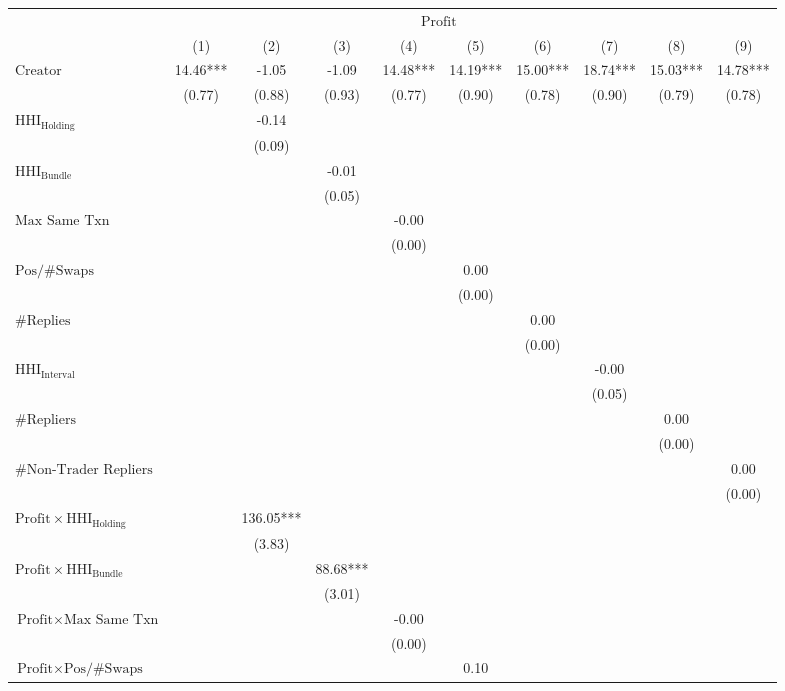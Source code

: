 \begin{tabular}{lccccccccc}
\hline
 & \multicolumn{8}{c}{$\text{Profit}$} \\ & (1) & (2) & (3) & (4) & (5) & (6) & (7) & (8) & (9)\\
\hline
$\text{Creator}$& 14.46*** & -1.05 & -1.09 & 14.48*** & 14.19*** & 15.00*** & 18.74*** & 15.03*** & 14.78*** \\
& (0.77) & (0.88) & (0.93) & (0.77) & (0.90) & (0.78) & (0.90) & (0.79) & (0.78) \\
$\text{HHI}_{\text{Holding}}$&  & -0.14 &  &  &  &  &  &  &  \\
&  & (0.09) &  &  &  &  &  &  &  \\
$\text{HHI}_{\text{Bundle}}$&  &  & -0.01 &  &  &  &  &  &  \\
&  &  & (0.05) &  &  &  &  &  &  \\
$\text{Max Same Txn}$&  &  &  & -0.00 &  &  &  &  &  \\
&  &  &  & (0.00) &  &  &  &  &  \\
$\text{Pos/\#Swaps}$&  &  &  &  & 0.00 &  &  &  &  \\
&  &  &  &  & (0.00) &  &  &  &  \\
$\#\text{Replies}$&  &  &  &  &  & 0.00 &  &  &  \\
&  &  &  &  &  & (0.00) &  &  &  \\
$\text{HHI}_{\text{Interval}}$&  &  &  &  &  &  & -0.00 &  &  \\
&  &  &  &  &  &  & (0.05) &  &  \\
$\#\text{Repliers}$&  &  &  &  &  &  &  & 0.00 &  \\
&  &  &  &  &  &  &  & (0.00) &  \\
$\#\text{Non-Trader Repliers}$&  &  &  &  &  &  &  &  & 0.00 \\
&  &  &  &  &  &  &  &  & (0.00) \\
$\text{Profit} \times \text{HHI}_{\text{Holding}}$&  & 136.05*** &  &  &  &  &  &  &  \\
&  & (3.83) &  &  &  &  &  &  &  \\
$\text{Profit} \times \text{HHI}_{\text{Bundle}}$&  &  & 88.68*** &  &  &  &  &  &  \\
&  &  & (3.01) &  &  &  &  &  &  \\
$\text{Profit} \times \text{Max Same Txn}$&  &  &  & -0.00 &  &  &  &  &  \\
&  &  &  & (0.00) &  &  &  &  &  \\
$\text{Profit} \times \text{Pos/\#Swaps}$&  &  &  &  & 0.10 &  &  &  &  \\

\end{tabular}
